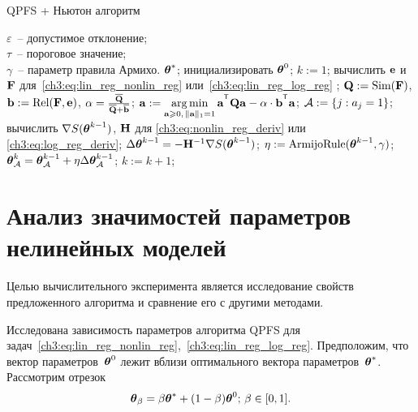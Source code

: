 \begin{algorithm}
	\caption{QPFS + Ньютон алгоритм}
	\label{pc:QPFSNewton}
	\begin{algorithmic}
		\REQUIRE $\varepsilon$~-- допустимое отклонение;\\
		\hspace{1.07cm}$\tau$~-- пороговое значение;\\
		\hspace{1.07cm}$\gamma$~-- параметр правила Армихо.
		\ENSURE $\boldsymbol{\theta}^*$;
		\STATE  инициализировать $\boldsymbol{\theta}^0$;
		\STATE $k := 1$;
		\REPEAT
		\STATE вычислить $\mathbf{e}$ и $\mathbf{F}$ для~\eqref{ch3:eq:lin_reg_nonlin_reg} или~\eqref{ch3:eq:lin_reg_log_reg} ;
		\vspace{0.1cm}
		\STATE $\mathbf{Q} := \text{Sim} (\mathbf{F})$, $\mathbf{b} := \text{Rel}(\mathbf{F}, \mathbf{e})$, $\alpha = \frac{\overline{\mathbf{Q}}}{\overline{\mathbf{Q}} + \overline{\mathbf{b}}}$;
		\vspace{0.1cm}
		\STATE $\ba := \argmin_{\ba \geq 0, \, \|\ba\|_1=1}\ba^{\T} \bQ \ba - \alpha \cdot \mathbf{b}^{\T} \ba$;
		\vspace{0.1cm}
		\STATE $\mathcal{A} := \{j: a_j = 1\}$;
		\vspace{0.1cm}
		\STATE вычислить $\nabla S(\boldsymbol{\theta}^{k-1})$, $\mathbf{H}$ для \eqref{ch3:eq:nonlin_reg_deriv} или \eqref{ch3:eq:log_reg_deriv};
		\vspace{0.1cm}
		\STATE $\Delta \boldsymbol{\theta}^{k-1} = - \mathbf{H}^{-1} \nabla S(\boldsymbol{\theta}^{k-1})$;
		\vspace{0.1cm}
		\STATE $\eta := \text{ArmijoRule}(\boldsymbol{\theta}^{k-1}, \gamma)$;
		\vspace{0.1cm}
		\STATE $\boldsymbol{\theta}_{\mathcal{A}}^k = \boldsymbol{\theta}_{\mathcal{A}}^{k - 1} + \eta \Delta \boldsymbol{\theta}_{\mathcal{A}}^{k - 1}$;
		\vspace{0.1cm}
		\STATE $k := k + 1$;
		\vspace{0.1cm}
	\end{algorithmic}
\end{algorithm}

  \section{Анализ значимостей параметров нелинейных моделей}
Целью вычислительного эксперимента является исследование свойств предложенного алгоритма и сравнение его с другими методами. 

Исследована зависимость параметров алгоритма QPFS для задач~\eqref{ch3:eq:lin_reg_nonlin_reg},~\eqref{ch3:eq:lin_reg_log_reg}. 
Предположим, что вектор параметров~$\boldsymbol{\theta}^0$ лежит вблизи оптимального вектора параметров~$\boldsymbol{\theta}^*$. 
Рассмотрим отрезок
\[
\boldsymbol{\theta}_{\beta} = \beta \boldsymbol{\theta}^* + (1 - \beta) \boldsymbol{\theta}^0; \, \beta \in [0, 1] .
\]

